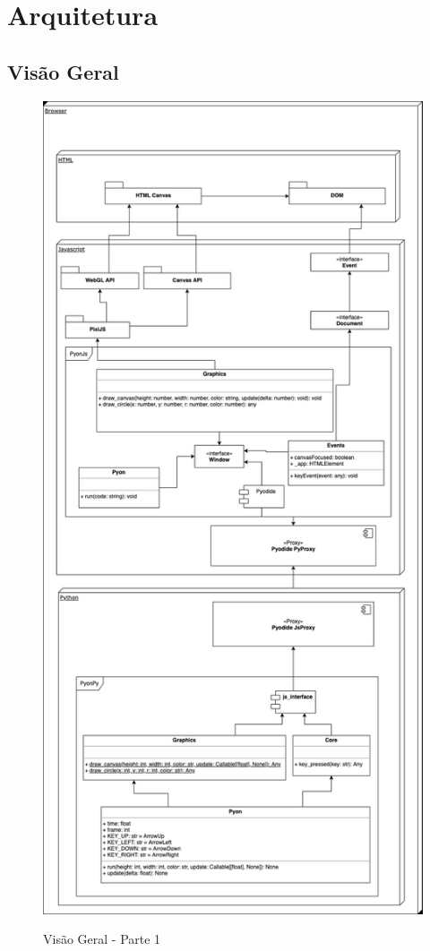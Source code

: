 \chapter[Arquitetura]{Arquitetura}

\section{Visão Geral}

\begin{figure}[!h]
    \centering
    \caption{Visão Geral - Parte 1}
    \includegraphics[trim={0 23cm 0 0},clip,keepaspectratio=true,scale=0.8]{figuras/Arquitetura.eps}
    \label{fig:arquitetura}
\end{figure}

